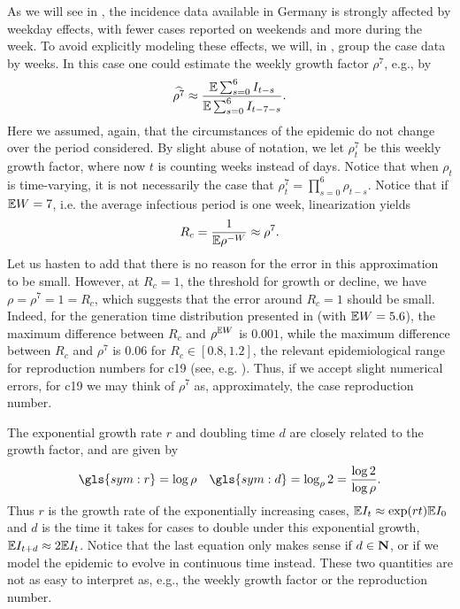 As we will see in , the incidence data available in Germany is strongly affected by weekday effects, with fewer cases reported on weekends and more during the week. To avoid explicitly modeling these effects, we will, in , group the case data by weeks. In this case one could estimate the weekly growth factor $\rho^{7}$, e.g., by
\begin{align}
    \label{eq:rho7_smooth}
    \widehat{\rho^{7}} \approx \frac{ \mathbb E \sum_{s = 0}^{6} I_{t - s}}{\mathbb E \sum_{s = 0}^6 I_{t - 7 - s}}.
\end{align}
Here we assumed, again, that the circumstances of the epidemic do not change over the period considered. By slight abuse of notation, we let $\rho^{7}_t$ be this weekly growth factor, where now $t$ is counting weeks instead of days. Notice that when $\rho_{t}$ is time-varying, it is not necessarily the case that $\rho^{7}_t = \prod_{s = 0}^{6} \rho_{t - s}$. Notice that if $\mathbb E W = 7$, i.e. the average infectious period is one week, linearization yields
$$
    R_{c} = \frac{1}{\mathbb E \rho^{-W}} \approx \rho^{7}.
$$
Let us hasten to add that there is no reason for the error in this approximation to be small. 
However, at $R_{c} = 1$, the threshold for growth or decline, we have $\rho = \rho^{7} = 1 = R_{c}$, which suggests that the error around $R_{c} = 1$ should be small. Indeed, for the generation time distribution presented in  (with $\mathbb E W = 5.6$), the maximum difference between $R_{c}$ and $\rho^{\mathbb E W}$ is $0.001$, while the maximum difference between $R_{c}$ and $\rho^{7}$ is $0.06$ for $R_{c} \in [0.8, 1.2]$, the relevant epidemiological range for reproduction numbers for \acrshort{c19} (see, e.g. ).
Thus, if we accept slight numerical errors, for \acrshort{c19} we may think of $\rho^{7}$ as, approximately, the case reproduction number. 

The exponential growth rate $r$ and doubling time $d$ are closely related to the growth factor, and are given by 
\begin{align*}
    \gls{sym:r} = \log \rho && \gls{sym:d} = \log_{\rho} 2 = \frac{\log 2}{\log \rho}.
\end{align*}
Thus $r$ is the growth rate of the exponentially increasing cases, $\mathbb E I_{t} \approx \exp(rt) \mathbb E I_{0}$ and $d$ is the time it takes for cases to double under this exponential growth, $\mathbb E I_{t + d} \approx 2\mathbb E I_{t}$. Notice that the last equation only makes sense if $d \in \mathbf N$, or if we model the epidemic to evolve in continuous time instead. These two quantities are not as easy to interpret as, e.g., the weekly growth factor or the reproduction number. 

